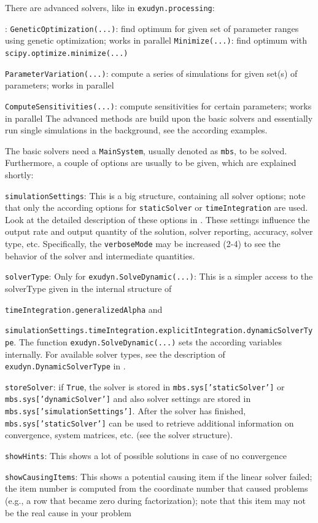 There are advanced solvers, like in \texttt{exudyn.processing}:
\bi
  \item {}:
  \bi
    \texttt{GeneticOptimization(...)}: find optimum for given set of parameter ranges using genetic optimization; works in parallel
    \texttt{Minimize(...)}: find optimum with \texttt{scipy.optimize.minimize(...)}
  \ei
\ei
\bi
  \item \texttt{ParameterVariation(...)}: compute a series of simulations for given set(s) of parameters; works in parallel
  \item \texttt{ComputeSensitivities(...)}: compute sensitivities for certain parameters; works in parallel
\ei
The advanced methods are build upon the basic solvers and essentially run single simulations in the background, see the according examples.

The basic solvers need a \texttt{MainSystem}, usually denoted as \texttt{mbs}, to be solved. Furthermore, a couple of options are usually to be given, which are explained shortly:
\bi
  \item \texttt{simulationSettings}: This is a big structure, containing all solver options; note that only the according options for \texttt{staticSolver} or \texttt{timeIntegration} are used. Look at the detailed description of these options in . These settings influence the output rate and output quantity of the solution, solver reporting, accuracy, solver type, etc. Specifically, the \texttt{verboseMode} may be increased (2-4) to see the behavior of the solver and intermediate quantities.
  \item \texttt{solverType}: Only for \texttt{exudyn.SolveDynamic(...)}: This is a simpler access to the solverType given in the internal structure of 
  \bi
  \item[] \texttt{timeIntegration.generalizedAlpha} and 
  \item[] \texttt{simulationSettings.timeIntegration.explicitIntegration.dynamicSolverType}.
  \ei
\ei
The function \texttt{exudyn.SolveDynamic(...)} sets the according variables internally. For available solver types, see the description of \texttt{exudyn.DynamicSolverType} in .
\bi
  \item \texttt{storeSolver}: if \texttt{True}, the solver is stored in \texttt{mbs.sys['staticSolver']} or \texttt{mbs.sys['dynamicSolver']} and also solver settings are stored in \texttt{mbs.sys['simulationSettings']}. After the solver has finished, \texttt{mbs.sys['staticSolver']} can be used to retrieve additional information on convergence, system matrices, etc. (see the solver structure).
  \item \texttt{showHints}: This shows a lot of possible solutions in case of no convergence
  \item \texttt{showCausingItems}: This shows a potential causing item if the linear solver failed; the item number is computed from the coordinate number that caused problems (e.g., a row that became zero during factorization); note that this item may not be the real cause in your problem
\ei

